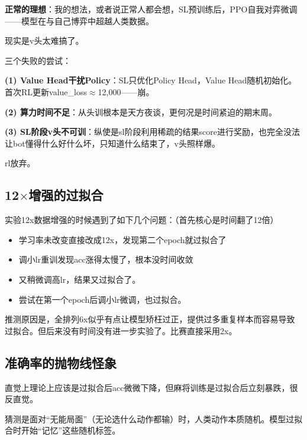\documentclass{article}
\begin{document}
\textbf{正常的理想}：我的想法，或者说正常人都会想，SL预训练后，PPO自我对弈微调——模型在与自己博弈中超越人类数据。

现实是v头太难搞了。

三个失败的尝试：

\textbf{(1) Value Head干扰Policy}：SL只优化Policy Head，Value Head随机初始化。首次RL更新value\_loss$\approx$12,000——崩。

\textbf{(2) 算力时间不足}：从头训根本是天方夜谈，更何况是时间紧迫的期末周。

\textbf{(3) SL阶段v头不可训}：纵使是sl阶段利用稀疏的结果score进行奖励，也完全没法让bot懂得什么好什么坏，只知道什么结束了，v头照样爆。

rl放弃。

\subsection{12$\times$增强的过拟合}

实验12x数据增强的时候遇到了如下几个问题：（首先核心是时间翻了12倍）

\begin{itemize}
  \item 学习率未改变直接改成12x，发现第二个epoch就过拟合了
  \item 调小lr重训发现acc涨得太慢了，根本没时间收敛
  \item 又稍微调高lr，结果又过拟合了。
  \item 尝试在第一个epoch后调小lr微调，也过拟合。
\end{itemize}

推测原因是，全排列6x似乎有点让模型矫枉过正，提供过多重复样本而容易导致过拟合。但后来没有时间没有进一步实验了。比赛直接采用2x。

\subsection{准确率的抛物线怪象}

直觉上理论上应该是过拟合后acc微微下降，但麻将训练是过拟合后立刻暴跌，很反直觉。

猜测是面对``无能局面''（无论选什么动作都输）时，人类动作本质随机。模型过拟合时开始``记忆''这些随机标签。
\end{document}
